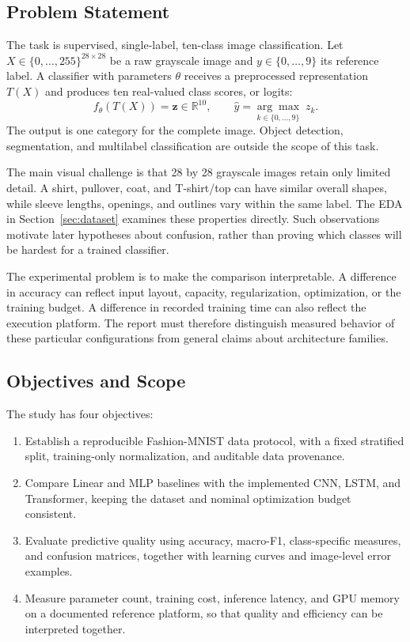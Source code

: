\subsection{Problem Statement}
The task is supervised, single-label, ten-class image classification. Let
\(X\in\{0,\ldots,255\}^{28\times28}\) be a raw grayscale image and
\(y\in\{0,\ldots,9\}\) its reference label. A classifier with parameters
\(\theta\) receives a preprocessed representation \(T(X)\) and produces
ten real-valued class scores, or logits:
\begin{equation}
 f_\theta(T(X))=\boldsymbol{z}\in\mathbb{R}^{10},
 \qquad \widehat{y}=\underset{k\in\{0,\ldots,9\}}{\arg\max}\;z_k.
 \label{eq:task}
\end{equation}
The output is one category for the complete image. Object detection,
segmentation, and multilabel classification are outside the scope of this task.

The main visual challenge is that 28 by 28 grayscale images retain only limited
detail. A shirt, pullover, coat, and T-shirt/top can have similar overall shapes,
while sleeve lengths, openings, and outlines vary within the same label. The
EDA in Section~\ref{sec:dataset} examines these properties directly. Such
observations motivate later hypotheses about confusion, rather than proving
which classes will be hardest for a trained classifier.

The experimental problem is to make the comparison interpretable. A difference
in accuracy can reflect input layout, capacity, regularization, optimization,
or the training budget. A difference in recorded training time can also reflect
the execution platform. The report must therefore distinguish measured behavior
of these particular configurations from general claims about architecture families.

\subsection{Objectives and Scope}
The study has four objectives:
\begin{enumerate}
 \item Establish a reproducible Fashion-MNIST data protocol, with a fixed
 stratified split, training-only normalization, and auditable data provenance.
 \item Compare Linear and MLP baselines with the implemented CNN, LSTM, and
 Transformer, keeping the dataset and nominal optimization budget consistent.
 \item Evaluate predictive quality using accuracy, macro-F1, class-specific
 measures, and confusion matrices, together with learning curves and image-level
 error examples.
 \item Measure parameter count, training cost, inference latency, and GPU memory
 on a documented reference platform, so that quality and efficiency can be
 interpreted together.
\end{enumerate}

